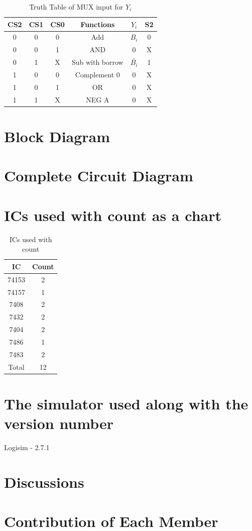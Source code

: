 \documentclass[11pt]{article}
\begin{document}
\begin{table}[ht]
    \centering
    \begin{tabular}{|c|c|c|c|c|c|}
        \hline
        CS2 & CS1 & CS0 & Functions & $Y_i$ & S2 \\
        \hline
        0 & 0 & 0 & Add & $B_i$ & 0 \\
        \hline
        0 & 0 & 1 & AND & 0 & X \\
        \hline
        0 & 1 & X & Sub with borrow & $\bar{B_i}$ & 1 \\
        \hline
        1 & 0 & 0 & Complement 0 & 0 & X \\
        \hline
        1 & 0 & 1 & OR & 0 & X \\
        \hline
        1 & 1 & X & NEG A & 0 & X \\
        \hline
    \end{tabular}
    \caption{Truth Table of MUX input for $Y_i$}
\end{table}

\section{Block Diagram}

\section{Complete Circuit Diagram}

\section{ICs used with count as a chart}
\begin{table}[ht]
    \centering
    \begin{tabular}{|c|c|}
        \hline
        IC & Count \\
        \hline
        74153 & 2 \\
        \hline
        74157 & 1 \\
        \hline
        7408 & 2 \\
        \hline
        7432 & 2 \\
        \hline
        7404 & 2 \\
        \hline
        7486 & 1 \\
        \hline
        7483 & 2 \\
        \hline
        Total & 12 \\
        \hline
    \end{tabular}
    \caption{ICs used with count}
\end{table}

\section{The simulator used along with the version number}
Logisim - 2.7.1

\section{Discussions}

\section{Contribution of Each Member}
\end{document}
